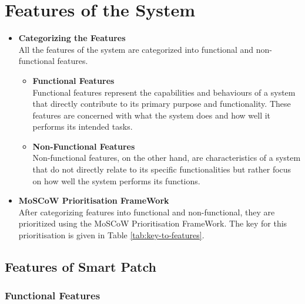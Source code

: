 \chapter{Features of the System}
\label{app:features}

\begin{itemize}
    \item \textbf{Categorizing the Features} \\
    All the features of the system are categorized into functional and non-functional features.
    \begin{itemize}
        \item \textbf{Functional Features} \\
    Functional features represent the capabilities and behaviours of a system that directly contribute to its primary purpose and functionality. These features are concerned with what the system does and how well it performs its intended tasks.

        \item \textbf{Non-Functional Features} \\
    Non-functional features, on the other hand, are characteristics of a system that do not directly relate to its specific functionalities but rather focus on how well the system performs its functions. 
    
    \end{itemize}
     	
    \item \textbf{MoSCoW Prioritisation FrameWork}\\
    After categorizing features into functional and non-functional, they are prioritized using the MoSCoW Prioritisation FrameWork. The key for this prioritisation is given in Table \ref{tab:key-to-features}.

    \end{itemize}

    


\section{Features of Smart Patch}
\subsection{Functional Features}

